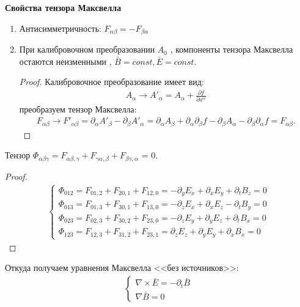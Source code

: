 \textbf{Свойства тензора Максвелла}
\begin{enumerate}
\item Антисимметричность: $F_{\alpha\beta}=-F_{\beta\alpha}$
\item При калибровочном преобразовании $A_0$ , компоненты тензора Максвелла остаются неизменными , $\bar{B}=const, \bar{E}=const$.
\begin{proof}
Калибровочное преобразование имеет вид:
\begin{gather*}
	 A_\alpha\to A'_\alpha= A_\alpha+\frac{\partial f}{\partial x^\alpha}
\end{gather*}
преобразуем тензор Максвелла:
\begin{gather*}
F_{\alpha\beta}\to F'_{\alpha\beta} =
\partial_\alpha A'_\beta - \partial_\beta A'_\alpha =
\partial_\alpha A_\beta + \partial_\alpha\partial_\beta f - \partial_\beta A_\alpha-\partial_\beta\partial_\alpha f=
F_{\alpha\beta}.
\end{gather*}
\end{proof}

\end{enumerate}

\begin{statement}
Тензор $\Phi_{\alpha\beta\gamma}=F_{\alpha\beta,\gamma}+F_{\gamma\alpha,\beta}+F_{\beta\gamma,\alpha}$ = 0.
\end{statement}
\begin{proof}
\begin{gather}
\begin{cases}
\Phi_{012}=F_{01,2}+F_{20,1}+F_{12,0}=-\partial_y E_x+\partial_x E_y + \partial_t B_z=0\\
\Phi_{013}=F_{01,3}+F_{30,1}+F_{13,0}=-\partial_z E_x+\partial_x E_z - \partial_t B_y=0\\
\Phi_{023}=F_{02,3}+F_{30,2}+F_{23,0}=-\partial_z E_y+\partial_y E_z + \partial_t B_x=0\\
\Phi_{123}=F_{12,3}+F_{31,2}+F_{23,1}=\partial_z E_z+\partial_y E_y + \partial_x B_x=0
\end{cases}
\end{gather}
\end{proof}
Откуда получаем уравнения Максвелла <<без источников>>:
\begin{gather}
\begin{cases}
	\nabla\times\bar{E}=-\partial_t\bar{B}\\
	\nabla\bar{B}=0
\end{cases}
\end{gather}

